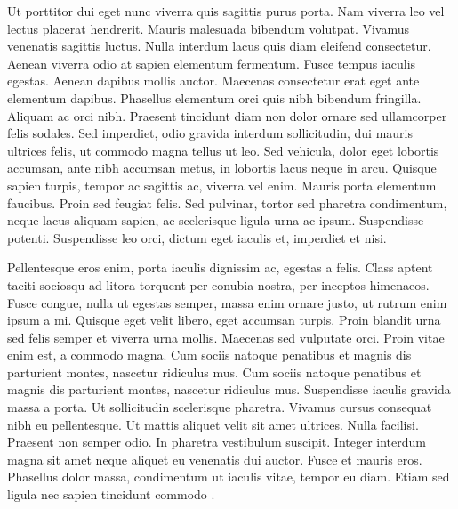 \begin{refsection}
Ut porttitor dui eget nunc viverra quis sagittis purus porta. Nam
viverra leo vel lectus placerat hendrerit. Mauris malesuada bibendum
volutpat. Vivamus venenatis sagittis luctus. Nulla interdum lacus quis
diam eleifend consectetur. Aenean viverra odio at sapien elementum
fermentum. Fusce tempus iaculis egestas. Aenean dapibus mollis
auctor. Maecenas consectetur erat eget ante elementum
dapibus. Phasellus elementum orci quis nibh bibendum
fringilla. Aliquam ac orci nibh. Praesent tincidunt diam non dolor
ornare sed ullamcorper felis sodales. Sed imperdiet, odio gravida
interdum sollicitudin, dui mauris ultrices felis, ut commodo magna
tellus ut leo. Sed vehicula, dolor eget lobortis accumsan, ante nibh
accumsan metus, in lobortis lacus neque in arcu. Quisque sapien
turpis, tempor ac sagittis ac, viverra vel enim. Mauris porta
elementum faucibus. Proin sed feugiat felis. Sed pulvinar, tortor sed
pharetra condimentum, neque lacus aliquam sapien, ac scelerisque
ligula urna ac ipsum. Suspendisse potenti. Suspendisse leo orci,
dictum eget iaculis et, imperdiet et nisi.

Pellentesque eros enim, porta iaculis dignissim ac, egestas a
felis. Class aptent taciti sociosqu ad litora torquent per conubia
nostra, per inceptos himenaeos. Fusce congue, nulla ut egestas semper,
massa enim ornare justo, ut rutrum enim ipsum a mi. Quisque eget velit
libero, eget accumsan turpis. Proin blandit urna sed felis semper et
viverra urna mollis. Maecenas sed vulputate orci. Proin vitae enim
est, a commodo magna. Cum sociis natoque penatibus et magnis dis
parturient montes, nascetur ridiculus mus. Cum sociis natoque
penatibus et magnis dis parturient montes, nascetur ridiculus
mus. Suspendisse iaculis gravida massa a porta. Ut sollicitudin
scelerisque pharetra. Vivamus cursus consequat nibh eu
pellentesque. Ut mattis aliquet velit sit amet ultrices. Nulla
facilisi. Praesent non semper odio. In pharetra vestibulum
suscipit. Integer interdum magna sit amet neque aliquet eu venenatis
dui auctor. Fusce et mauris eros. Phasellus dolor massa, condimentum
ut iaculis vitae, tempor eu diam. Etiam sed ligula nec sapien
tincidunt commodo \cite{Bader}.


\end{refsection}
